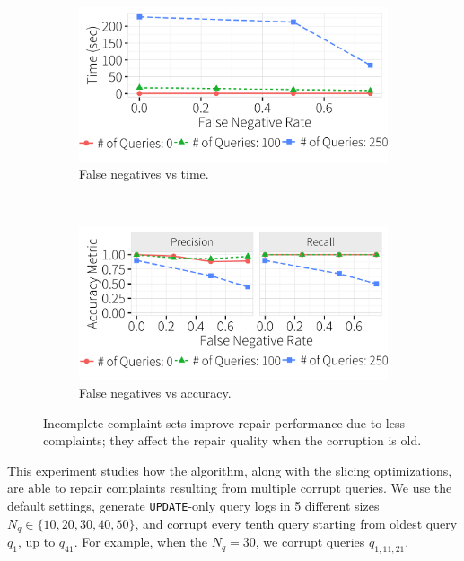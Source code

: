     
\begin{figure}[!htb]
  \hspace*{-.1in}
  \centering
    \begin{subfigure}[t]{.33\textwidth}
      \includegraphics[width = .99\columnwidth]{figures/noise_fn_time} 
      \vspace*{-.1in}
      \caption{False negatives vs time.}
      \label{f:falsenegative_time} 
    \end{subfigure}
    \\
    \begin{subfigure}[t]{.33\textwidth}
      \includegraphics[width = .99\columnwidth]{figures/noise_fn_acc}
      \vspace*{-.1in}
      \caption{False negatives vs accuracy.}
      \label{f:falsenegative_acc} 
    \end{subfigure}
    \vspace*{-.1in}
    \caption{Incomplete complaint sets improve repair performance due to less complaints; they affect the repair quality when the corruption is old.}
  \end{figure}



 
This experiment studies how the \naive algorithm, along with the slicing optimizations, are able to repair complaints resulting from multiple corrupt queries.
We use the default settings, generate \texttt{UPDATE}-only query logs in 5 different sizes $N_q\in \{10, 20, 30, 40, 50\}$, and corrupt every tenth query starting from oldest query $q_1$, up to $q_{41}$.  
For example, when the $N_q = {30}$, we corrupt queries $q_{1,11,21}$. 


